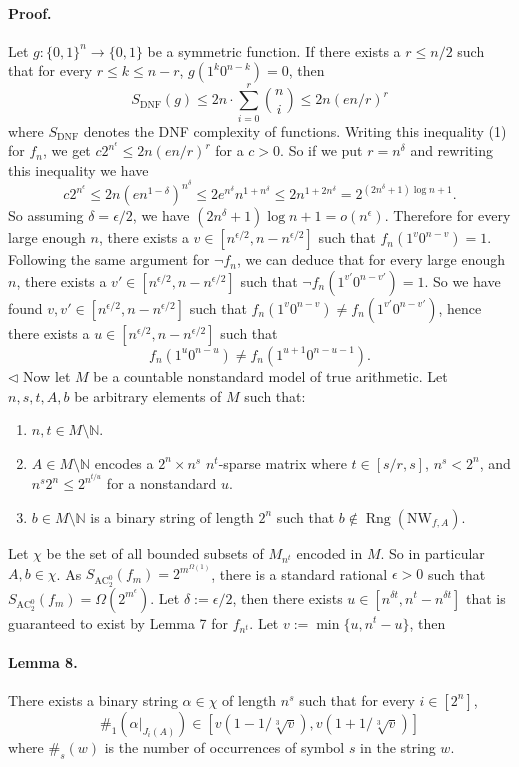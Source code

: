 \documentclass[10pt,a4paper]{article}
\begin{document}
\paragraph{Proof.} Let $g:\{0,1\}^n\to\{0,1\}$ be a symmetric function. If there exists a $r\leq n/2$ such that for every $r\leq k\leq n-r$, $g(1^k0^{n-k})=0$, then
\[S_{\mathrm{DNF}}(g)\leq2n\cdot\sum_{i=0}^r\binom ni\leq2n(en/r)^r\]
where $S_{\mathrm{DNF}}$ denotes the DNF complexity of functions. Writing this inequality (1) for $f_n$, we get $c2^{n^\epsilon}\leq2n(en/r)^r$ for a $c>0$. So if we put $r=n^\delta$ and rewriting this inequality we have
\[c2^{n^\epsilon}\leq2n(en^{1-\delta})^{n^\delta}\leq2e^{n^\delta}n^{1+n^\delta}\leq2n^{1+2n^\delta}=2^{(2n^\delta+1)\log n+1}.\]
So assuming $\delta=\epsilon/2$, we have $(2n^\delta+1)\log n+1=o(n^\epsilon)$. Therefore for every large enough $n$, there exists a $v\in[n^{\epsilon/2},n-n^{\epsilon/2}]$ such that $f_n(1^v0^{n-v})=1$. Following the same argument for $\neg f_n$, we can deduce that for every large enough $n$, there exists a $v'\in[n^{\epsilon/2},n-n^{\epsilon/2}]$ such that $\neg f_n(1^{v'}0^{n-v'})=1$. So we have found $v,v'\in[n^{\epsilon/2},n-n^{\epsilon/2}]$ such that $f_n(1^v0^{n-v})\neq f_n(1^{v'}0^{n-v'})$, hence there exists a $u\in[n^{\epsilon/2},n-n^{\epsilon/2}]$ such that
\[f_n(1^u0^{n-u})\neq f_n(1^{u+1}0^{n-u-1}).\]\hfill$\triangleleft$
Now let $M$ be a countable nonstandard model of true arithmetic. Let $n,s,t,A,b$ be arbitrary elements of $M$ such that:
\begin{enumerate}
\item $n,t\in M\setminus\mathbb N$.
\item $A\in M\setminus\mathbb N$ encodes a $2^n\times n^s$ $n^t$-sparse matrix where $t\in[s/r,s]$, $n^s<2^n$, and $n^s2^n\leq2^{n^{t/u}}$ for a nonstandard $u$.
\item $b\in M\setminus\mathbb N$ is a binary string of length $2^n$ such that $b\notin\operatorname{Rng}(\mathrm{NW}_{f,A})$.
\end{enumerate}
Let $\chi$ be the set of all bounded subsets of $M_{n^t}$ encoded in $M$. So in particular $A,b\in\chi$.
As $S_{\mathrm{AC}_2^0}(f_m)=2^{m^{\Omega(1)}}$, there is a standard rational $\epsilon>0$ such that $S_{\mathrm{AC}_2^0}(f_m)=\Omega(2^{m^\epsilon})$. Let $\delta:=\epsilon/2$, then there exists $u\in[n^{\delta t},n^t-n^{\delta t}]$ that is guaranteed to exist by Lemma 7 for $f_{n^t}$. Let $v:=\min\{u,n^t-u\}$, then
\paragraph{Lemma 8.} There exists a binary string $\alpha\in\chi$ of length $n^s$ such that for every $i\in[2^n]$,
\[\#_1(\alpha|_{J_i(A)})\in[v(1-1/\sqrt[3]v),v(1+1/\sqrt[3]v)]\]
where $\#_s(w)$ is the number of occurrences of symbol $s$ in the string $w$.
\end{document}
